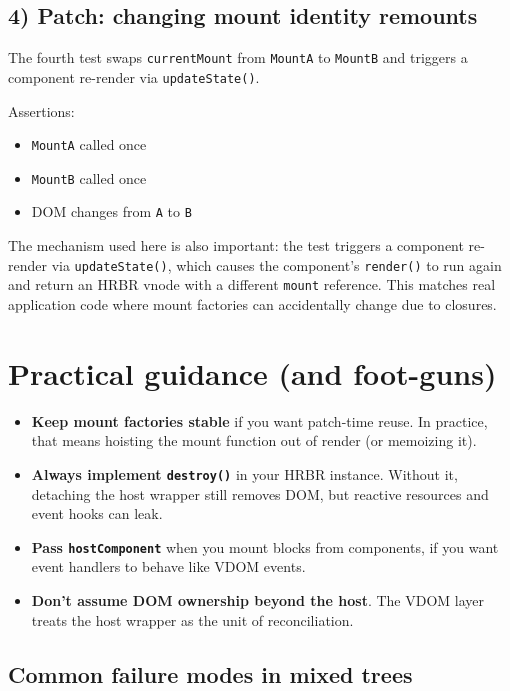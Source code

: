 \subsection{4) Patch: changing mount identity remounts}

The fourth test swaps \texttt{currentMount} from \texttt{MountA} to \texttt{MountB} and triggers a component re-render via \texttt{updateState()}.

Assertions:

\begin{itemize}
\item \texttt{MountA} called once
\item \texttt{MountB} called once
\item DOM changes from \texttt{A} to \texttt{B}
\end{itemize}

The mechanism used here is also important: the test triggers a component re-render via \texttt{updateState()}, which causes the component's \texttt{render()} to run again and return an HRBR vnode with a different \texttt{mount} reference. This matches real application code where mount factories can accidentally change due to closures.

\section{Practical guidance (and foot-guns)}

\begin{itemize}
\item \textbf{Keep mount factories stable} if you want patch-time reuse. In practice, that means hoisting the mount function out of render (or memoizing it).
\item \textbf{Always implement \texttt{destroy()}} in your HRBR instance. Without it, detaching the host wrapper still removes DOM, but reactive resources and event hooks can leak.
\item \textbf{Pass \texttt{hostComponent}} when you mount blocks from components, if you want event handlers to behave like VDOM events.
\item \textbf{Don't assume DOM ownership beyond the host}. The VDOM layer treats the host wrapper as the unit of reconciliation.
\end{itemize}

\subsection{Common failure modes in mixed trees}

